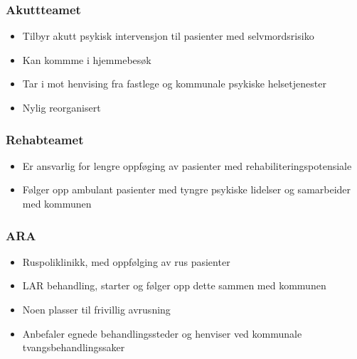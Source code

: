 \documentclass[11pt]{report} %
\begin{document}
                      \subsubsection{Akuttteamet}\label{sec:org_ddps_akutt}
                          \begin{itemize}
                            \item Tilbyr akutt psykisk intervensjon til pasienter med selvmordsrisiko\\
                            \item Kan kommme i hjemmebesøk\\
                            \item Tar i mot henvising fra fastlege og kommunale psykiske helsetjenester\\
                            \item Nylig reorganisert\\
                          \end{itemize} 
                        \subsubsection{Rehabteamet}\label{sec:org_ddps_rehab}
                          \begin{itemize}
                            \item Er ansvarlig for lengre oppføging av pasienter med rehabiliteringspotensiale\\
                            \item Følger opp ambulant pasienter med tyngre psykiske lidelser og samarbeider med kommunen\\
                          \end{itemize}
                        \subsubsection{ARA}\label{sec:org_ddps_ARA}
                          \begin{itemize}
                            \item Ruspoliklinikk, med oppfølging av rus pasienter\\
                            \item LAR behandling, starter og følger opp dette sammen med kommunen\\
                            \item Noen plasser til frivillig avrusning\\
                            \item Anbefaler egnede behandlingssteder og henviser ved kommunale tvangsbehandlingssaker\\
                          \end{itemize}
\end{document}
